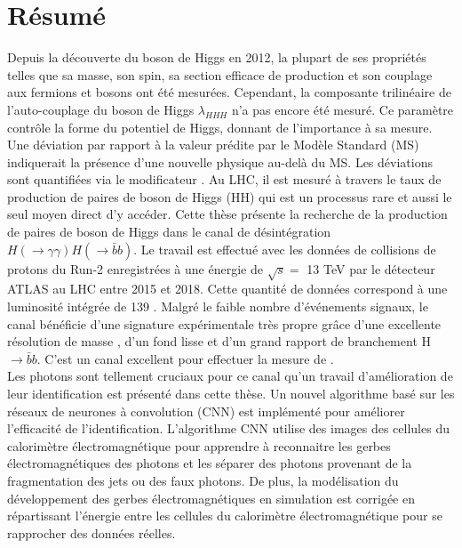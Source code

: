 \newpage
\chapter*{Résumé}

Depuis la découverte du boson de Higgs en 2012, la plupart de ses propriétés telles que sa masse, son spin, sa section efficace de production et son couplage aux fermions et bosons ont été mesurées. Cependant, la composante trilinéaire de l'auto-couplage du boson de Higgs $\lambda_{HHH}$ n'a pas encore été mesuré. Ce paramètre contrôle la forme du potentiel de Higgs, donnant de l'importance à sa mesure. Une déviation par rapport à la valeur prédite par le Modèle Standard (MS) indiquerait la présence d'une nouvelle physique au-delà du MS. Les déviations sont quantifiées via le modificateur \kl. Au LHC, il est mesuré à travers le taux de production de paires de boson de Higgs (HH) qui est un processus rare et aussi le seul moyen direct d'y accéder. Cette thèse présente la recherche de la production de paires de boson de Higgs dans le canal de désintégration $H(\to\gamma\gamma)H(\to\bar{b}b)$. 
Le travail est effectué avec les données de collisions de protons du Run-2 enregistrées à une énergie de $\sqrt{s} = $ 13 TeV par le détecteur ATLAS au LHC entre 2015 et 2018. Cette quantité de données correspond à une luminosité intégrée de 139 \ifb. Malgré le faible nombre d'événements signaux, le canal \bbyy bénéficie d'une signature expérimentale très propre grâce d'une excellente résolution de masse \myy, d'un fond lisse et d'un grand rapport de branchement H$\to\bar{b}b$. C'est un canal excellent pour effectuer la mesure de \kl. \\
Les photons sont tellement cruciaux pour ce canal qu'un travail d'amélioration de leur identification est présenté dans cette thèse. Un nouvel algorithme basé sur les réseaux de neurones à convolution (CNN) est implémenté pour améliorer l'efficacité de l'identification. L'algorithme CNN utilise des images des cellules du calorimètre électromagnétique pour apprendre à reconnaitre les gerbes électromagnétiques des photons et les séparer des photons provenant de la fragmentation des jets ou des faux photons. De plus, la modélisation du développement des gerbes électromagnétiques en simulation est corrigée en répartissant l'énergie entre les cellules du calorimètre électromagnétique pour se rapprocher des données réelles. \\
